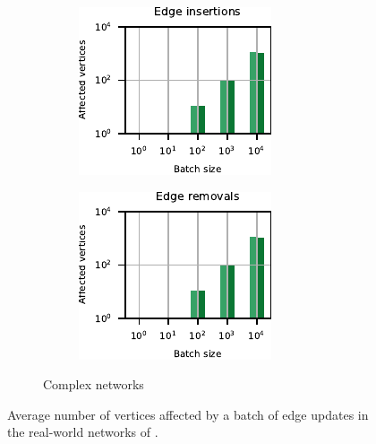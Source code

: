 \begin{figure}[t]
\begin{subfigure}[b]{.5\textwidth}
\begin{subfigure}[b]{.5\textwidth}
\centering
\includegraphics[width=.9\textwidth]{sources/plots/dyn-mwm/affected-cplx-insertion.pdf}
\end{subfigure}\hfill
\begin{subfigure}[b]{.5\textwidth}
\centering
\includegraphics[width=.9\textwidth]{sources/plots/dyn-mwm/affected-cplx-removal.pdf}
\end{subfigure}
\caption{Complex networks}
\end{subfigure}

\caption{Average number of vertices affected by a batch of edge updates in the
real-world networks of .}
\label{fig:dyn-mwm:affected-real-world}
\end{figure}


